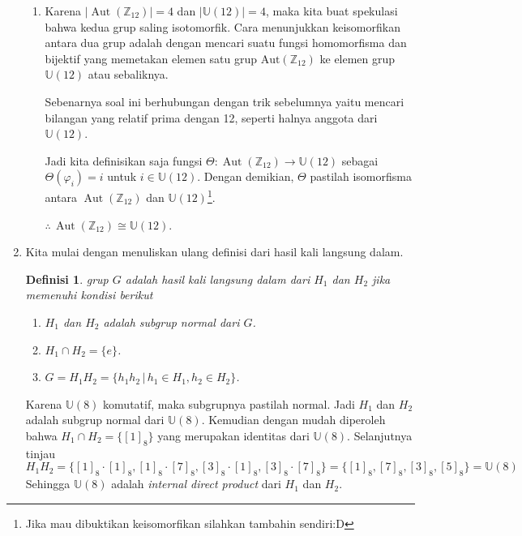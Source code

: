 \documentclass[10pt,openany,a4paper]{article}
\newtheorem*{definisi}{Definisi}
\begin{document}
\begin{enumerate}
\begin{enumerate}
        \item Karena $|\operatorname{Aut}(\mathbb{Z}_{12})|=4$ dan $|\mathbb{U}(12)|=4$, maka kita buat spekulasi bahwa kedua grup saling isotomorfik. Cara menunjukkan keisomorfikan antara dua grup adalah dengan mencari suatu fungsi homomorfisma dan bijektif yang memetakan elemen satu grup $\text{Aut}(\mathbb{Z}_{12})$ ke elemen grup $\mathbb{U}(12)$ atau sebaliknya.
        
        Sebenarnya soal ini berhubungan dengan trik sebelumnya yaitu mencari bilangan yang relatif prima dengan 12, seperti halnya anggota dari $\mathbb{U}(12)$. 
        
        Jadi kita definisikan saja fungsi $\Theta: \operatorname{Aut}(\mathbb{Z}_{12})\to \mathbb{U}(12)$ sebagai $\Theta(\varphi_i)=i$ untuk $i\in\mathbb{U}(12)$. Dengan demikian, $\Theta$ pastilah isomorfisma antara $\operatorname{Aut}(\mathbb{Z}_{12})$ dan $\mathbb{U}(12)$\footnote{Jika mau dibuktikan keisomorfikan silahkan tambahin sendiri:D}.

        $\therefore\,\operatorname{Aut}(\mathbb{Z}_{12}) \cong \mathbb{U}(12)$.
    \end{enumerate}

    \item Kita mulai dengan menuliskan ulang definisi dari hasil kali langsung dalam.
    \begin{definisi}
        grup $G$ adalah hasil kali langsung dalam dari $H_1$ dan $H_2$ jika memenuhi kondisi berikut
        \begin{enumerate}[label=(\arabic*)]
            \item $H_1$ dan $H_2$ adalah subgrup normal dari $G$.
            \item $H_1\cap H_2=\{e\}$.
            \item $G=H_1H_2=\{h_1h_2\,|\,h_1\in H_1, h_2\in H_2\}$.
        \end{enumerate}
    \end{definisi}
    Karena $\mathbb{U}(8)$ komutatif, maka subgrupnya pastilah normal. Jadi $H_1$ dan $H_2$ adalah subgrup normal dari $\mathbb{U}(8)$. Kemudian dengan mudah diperoleh bahwa $H_1\cap H_2=\{[1]_8\}$ yang merupakan identitas dari $\mathbb{U}(8)$. Selanjutnya tinjau
    \[H_1H_2=\{[1]_8\cdot[1]_8,[1]_8\cdot[7]_8,[3]_8\cdot[1]_8,[3]_8\cdot[7]_8\}=\{[1]_8,[7]_8,[3]_8,[5]_8\}=\mathbb{U}(8)\] 
    Sehingga $\mathbb{U}(8)$ adalah \textit{internal direct product} dari $H_1$ dan $H_2$.
\end{enumerate}
\begin{figure}[h!]
    \centering
\end{figure}
\end{document}
